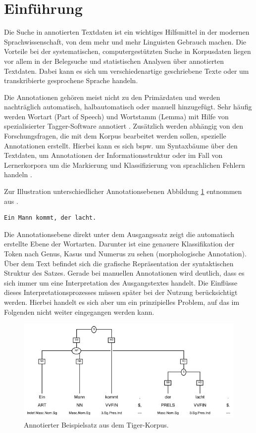 \section{Einführung}
Die Suche in annotierten Textdaten ist ein wichtiges Hilfsmittel in der modernen Sprachwissenschaft, von dem mehr und mehr Linguisten Gebrauch machen. Die Vorteile bei der systematischen, computergestützten Suche in Korpusdaten liegen vor allem in der Belegsuche und statistischen Analysen über annotierten Textdaten. Dabei kann es sich um verschiedenartige geschriebene Texte oder um transkribierte gesprochene Sprache handeln.

Die Annotationen gehören meist nicht zu den Primärdaten und werden nachträglich automatisch, halbautomatisch oder manuell hinzugefügt. Sehr häufig werden Wortart (Part of Speech) und Wortstamm (Lemma) mit Hilfe von spezialisierter Tagger-Software annotiert \citep[vgl.][für die automatische Annotation von Wortarten]{schmidt94}. Zusätzlich werden abhängig von den Forschungsfragen, die mit dem Korpus bearbeitet werden sollen, spezielle Annotationen erstellt. Hierbei kann es sich bspw. um Syntaxbäume über den Textdaten, um Annotationen der Informationsstruktur oder im Fall von Lernerkorpora um die Markierung und Klassifizierung von sprachlichen Fehlern handeln \citep[][]{falko-konvens06}.

Zur Illustration unterschiedlicher Annotationsebenen Abbildung \ref{fig:tiger-example1} entnommen aus \citet[][]{lezius02}.

\begin{verbatim}Ein Mann kommt, der lacht.\end{verbatim}

Die Annotationsebene direkt unter dem Ausgangssatz zeigt die automatisch erstellte Ebene der Wortarten. Darunter ist eine genauere Klassifikation der Token nach Genus, Kasus und Numerus zu sehen (morphologische Annotation). Über dem Text befindet sich die grafische Repräsentation der syntaktischen Struktur des Satzes. Gerade bei manuellen Annotationen wird deutlich, dass es sich immer um eine Interpretation des Ausgangstextes handelt. Die Einflüsse dieses Interpretationsprozesses müssen später bei der Nutzung berücksichtigt werden. Hierbei handelt es sich aber um ein prinzipielles Problem, auf das im Folgenden nicht weiter eingegangen werden kann.

\begin{figure}[H]
	\centering
	\includegraphics*[width=1.0\textwidth]{figures/tiger-example1}
	\caption{Annotierter Beispielsatz aus dem Tiger-Korpus.}
	\label{fig:tiger-example1}
\end{figure}



